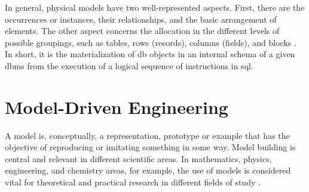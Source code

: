 In general, physical models have two well-represented aspects.
First, there are the occurrences or instances, their relationships, and the basic arrangement of elements.
The other aspect concerns the allocation in the different levels of possible groupings, such as tables, rows (records), columns (fields), and blocks \cite{West:2011}.
In short, it is the materialization of \ac{db} objects in an internal schema of a given \ac{dbms} from the execution of a logical sequence of instructions in \ac{sql}.

\section{Model-Driven Engineering}
\label{sec_back:mde}

A model is, conceptually, a representation, prototype or example that has the objective of reproducing or imitating something in some way.
Model building is central and relevant in different scientific areas.
In mathematics, physics, engineering, and chemistry areas, for example, the use of models is considered vital for theoretical and practical research in different fields of study \cite{Bailer:2009}.

